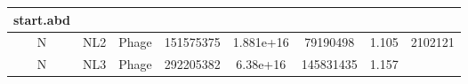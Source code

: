 \documentclass[]{article}
\begin{document}
\begin{longtable}[]{@{}cccccccc@{}}
\begin{minipage}[b]{0.12\columnwidth}\centering\strut
start.abd
\strut\end{minipage}\tabularnewline
\midrule
\endhead
\begin{minipage}[t]{0.07\columnwidth}\centering\strut
N
\strut\end{minipage} &
\begin{minipage}[t]{0.07\columnwidth}\centering\strut
NL2
\strut\end{minipage} &
\begin{minipage}[t]{0.11\columnwidth}\centering\strut
Phage
\strut\end{minipage} &
\begin{minipage}[t]{0.11\columnwidth}\centering\strut
151575375
\strut\end{minipage} &
\begin{minipage}[t]{0.11\columnwidth}\centering\strut
1.881e+16
\strut\end{minipage} &
\begin{minipage}[t]{0.11\columnwidth}\centering\strut
79190498
\strut\end{minipage} &
\begin{minipage}[t]{0.08\columnwidth}\centering\strut
1.105
\strut\end{minipage} &
\begin{minipage}[t]{0.12\columnwidth}\centering\strut
2102121
\strut\end{minipage}\tabularnewline
\begin{minipage}[t]{0.07\columnwidth}\centering\strut
N
\strut\end{minipage} &
\begin{minipage}[t]{0.07\columnwidth}\centering\strut
NL3
\strut\end{minipage} &
\begin{minipage}[t]{0.11\columnwidth}\centering\strut
Phage
\strut\end{minipage} &
\begin{minipage}[t]{0.11\columnwidth}\centering\strut
292205382
\strut\end{minipage} &
\begin{minipage}[t]{0.11\columnwidth}\centering\strut
6.38e+16
\strut\end{minipage} &
\begin{minipage}[t]{0.11\columnwidth}\centering\strut
145831435
\strut\end{minipage} &
\begin{minipage}[t]{0.08\columnwidth}\centering\strut
1.157

\end{minipage}
\end{longtable}
\end{document}
